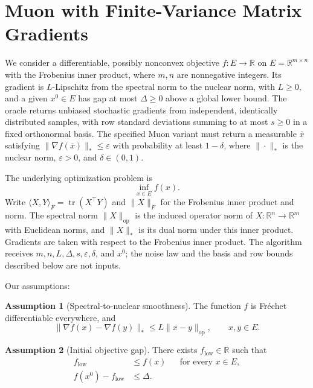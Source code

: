 \documentclass[10pt]{article}
\theoremstyle{definition}
\newtheorem{assumption}{Assumption}
\begin{document}
\section*{Muon with Finite-Variance Matrix Gradients}
We consider a differentiable, possibly nonconvex objective $f:E\to\mathbb{R}$ on $E=\mathbb{R}^{m\times n}$ with the Frobenius inner product, where $m,n$ are nonnegative integers. Its gradient is $L$-Lipschitz from the spectral norm to the nuclear norm, with $L\geq0$, and a given $x^0\in E$ has gap at most $\Delta\geq0$ above a global lower bound. The oracle returns unbiased stochastic gradients from independent, identically distributed samples, with row standard deviations summing to at most $s\geq0$ in a fixed orthonormal basis. The specified Muon variant must return a measurable $\bar{x}$ satisfying $\|\nabla f(\bar{x})\|_*\leq\varepsilon$ with probability at least $1-\delta$, where $\|\cdot\|_*$ is the nuclear norm, $\varepsilon>0$, and $\delta\in(0,1)$.

The underlying optimization problem is
\[
\inf_{x\in E} f(x).
\]
Write $\langle X,Y\rangle_F=\operatorname{tr}(X^\top Y)$ and $\|X\|_F$ for the Frobenius inner product and norm. The spectral norm $\|X\|_{\mathrm{op}}$ is the induced operator norm of $X:\mathbb{R}^n\to\mathbb{R}^m$ with Euclidean norms, and $\|X\|_*$ is its dual norm under this inner product. Gradients are taken with respect to the Frobenius inner product. The algorithm receives $m,n,L,\Delta,s,\varepsilon,\delta$, and $x^0$; the noise law and the basis and row bounds described below are not inputs.

Our assumptions:
\begin{assumption}[Spectral-to-nuclear smoothness]
The function $f$ is Fr\'echet differentiable everywhere, and
\[
\|\nabla f(x)-\nabla f(y)\|_*
\leq L\|x-y\|_{\mathrm{op}},
\qquad x,y\in E.
\]
\end{assumption}

\begin{assumption}[Initial objective gap]
There exists $f_{\mathrm{low}}\in\mathbb{R}$ such that
\[
\begin{aligned}
f_{\mathrm{low}}&\leq f(x) &&\text{for every }x\in E,\\
f(x^0)-f_{\mathrm{low}}&\leq\Delta.
\end{aligned}
\]
\end{assumption}
\end{document}
